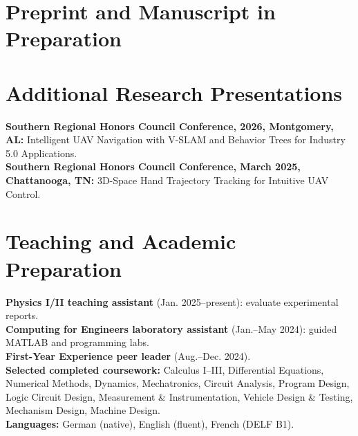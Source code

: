 \section{Preprint and Manuscript in Preparation}


\section{Additional Research Presentations}
{\small
\textbf{Southern Regional Honors Council Conference, 2026, Montgomery, AL:} Intelligent UAV Navigation with V-SLAM and Behavior Trees for Industry 5.0 Applications.\\[3pt]
\textbf{Southern Regional Honors Council Conference, March 2025, Chattanooga, TN:} 3D-Space Hand Trajectory Tracking for Intuitive UAV Control.}
\section{Teaching and Academic Preparation}
{\small
\textbf{Physics I/II teaching assistant} (Jan. 2025--present): evaluate experimental reports.\\[3pt]
\textbf{Computing for Engineers laboratory assistant} (Jan.--May 2024): guided MATLAB and programming labs.\\[3pt]
\textbf{First-Year Experience peer leader} (Aug.--Dec. 2024).\\[3pt]
\textbf{Selected completed coursework:} Calculus I--III, Differential Equations, Numerical Methods, Dynamics, Mechatronics, Circuit Analysis, Program Design, Logic Circuit Design, Measurement \& Instrumentation, Vehicle Design \& Testing, Mechanism Design, Machine Design.\\[3pt]
\textbf{Languages:} German (native), English (fluent), French (DELF B1).}

